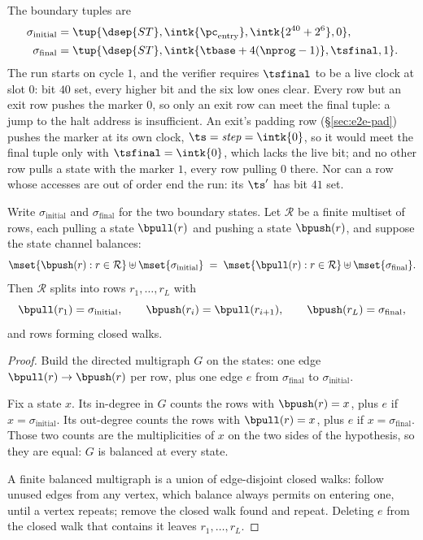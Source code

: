 The boundary tuples are
\begin{align*}
  \sigma_{\mathrm{initial}} &= \tup{\dsep{ST},\intk{\pc_{\mathrm{entry}}},\intk{2^{40}+2^{6}},0},\\
  \sigma_{\mathrm{final}} &= \tup{\dsep{ST},\intk{\tbase+4(\nprog-1)},\tsfinal,1}.
\end{align*}
The run starts on cycle $1$, and the verifier requires $\tsfinal$ to be a live clock at slot $0$: bit $40$ set, every higher bit and the six low ones clear. Every row but an exit row pushes the marker $0$, so only an exit row can meet the final tuple: a jump to the halt address is insufficient. An exit's padding row (\S\ref{sec:e2e-pad}) pushes the marker at its own clock, $\ts=\mathit{step}=\intk{0}$, so it would meet the final tuple only with $\tsfinal=\intk{0}$, which lacks the live bit; and no other row pulls a state with the marker $1$, every row pulling $0$ there. Nor can a row whose accesses are out of order end the run: its $\ts'$ has bit $41$ set.

\begin{proposition}\label{prop:walk}
Write $\sigma_{\mathrm{initial}}$ and $\sigma_{\mathrm{final}}$ for the two boundary states. Let $\mathcal R$ be a finite multiset of rows, each pulling a state $\bpull(r)$ and pushing a state $\bpush(r)$, and suppose the state channel balances:
\[
  \mset{\bpush(r):r\in\mathcal R}\uplus\mset{\sigma_{\mathrm{initial}}}
  \;=\;\mset{\bpull(r):r\in\mathcal R}\uplus\mset{\sigma_{\mathrm{final}}} .
\]
Then $\mathcal R$ splits into rows $r_1,\dots,r_L$ with
\[
  \bpull(r_1)=\sigma_{\mathrm{initial}},\qquad \bpush(r_i)=\bpull(r_{i+1}),\qquad \bpush(r_L)=\sigma_{\mathrm{final}},
\]
and rows forming closed walks.
\end{proposition}

\begin{proof}
Build the directed multigraph $G$ on the states: one edge $\bpull(r)\to \bpush(r)$ per row, plus one edge $e$ from $\sigma_{\mathrm{final}}$ to $\sigma_{\mathrm{initial}}$.

Fix a state $x$. Its in-degree in $G$ counts the rows with $\bpush(r)=x$, plus $e$ if $x=\sigma_{\mathrm{initial}}$. Its out-degree counts the rows with $\bpull(r)=x$, plus $e$ if $x=\sigma_{\mathrm{final}}$. Those two counts are the multiplicities of $x$ on the two sides of the hypothesis, so they are equal: $G$ is balanced at every state.

A finite balanced multigraph is a union of edge-disjoint closed walks: follow unused edges from any vertex, which balance always permits on entering one, until a vertex repeats; remove the closed walk found and repeat. Deleting $e$ from the closed walk that contains it leaves $r_1,\dots,r_L$.
\end{proof}

